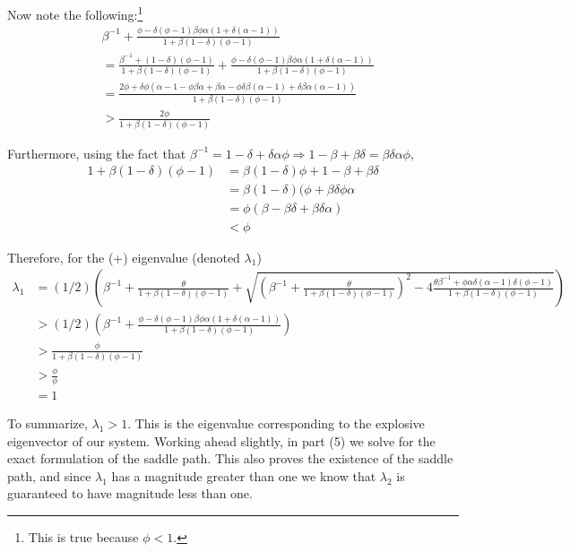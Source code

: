 \documentclass[11pt]{article} %
\begin{document}
Now note the following:\footnote{This is true because $\phi<1.$}
\begin{align*}
&\beta^{-1} +\frac{\phi -  \delta(\phi - 1)\beta \phi \alpha (1 + \delta(\alpha - 1))}{1 + \beta(1-\delta) (\phi - 1)} \\&= \frac{\beta^{-1} + (1-\delta) (\phi - 1)}{1 + \beta(1-\delta) (\phi - 1)}  + \frac{\phi -  \delta(\phi - 1)\beta \phi \alpha (1 + \delta(\alpha - 1))}{1 + \beta(1-\delta) (\phi - 1)} \\
&= \frac{2\phi + \delta \phi (\alpha - 1 - \phi \beta \alpha + \beta \alpha - \phi \delta \beta (\alpha - 1) + \delta\beta\alpha(\alpha - 1))  }{1 + \beta(1-\delta) (\phi - 1)}\\
&> \frac{2\phi }{1 + \beta(1-\delta) (\phi - 1)}
\end{align*}

Furthermore, using the fact that $\beta^{-1} = 1-\delta + \delta\alpha \phi \Rightarrow 1-\beta+\beta\delta = \beta\delta\alpha\phi,$
\begin{align*}
1 + \beta(1-\delta)(\phi - 1) &= \beta(1-\delta)\phi + 1 - \beta + \beta\delta\\
&= \beta(1-\delta)(\phi + \beta\delta\phi\alpha\\
&= \phi(\beta - \beta\delta + \beta\delta\alpha)\\
&<\phi
\end{align*}

Therefore, for the (+) eigenvalue (denoted $\lambda_1$)
\begin{align*}
\lambda_1 &= (1/2)\left( \beta^{-1} +\frac{\theta}{1 + \beta(1-\delta) (\phi - 1)} + \sqrt{\left( \beta^{-1} +\frac{\theta}{1 + \beta(1-\delta) (\phi - 1)}\right)^2 - 4\frac{\theta \beta^{-1} + \phi \alpha \delta (\alpha - 1)\delta(\phi - 1)}{1 + \beta(1-\delta) (\phi - 1)}} \right)\\
&>(1/2)\left(\beta^{-1} + \frac{\phi -  \delta(\phi - 1)\beta \phi \alpha (1 + \delta(\alpha - 1))}{1 + \beta(1-\delta) (\phi - 1)}\right)\\
&> \frac{\phi }{1 + \beta(1-\delta) (\phi - 1)}\\
&> \frac{\phi }{\phi}\\
&= 1
\end{align*}

To summarize, $\lambda_1 > 1.$ This is the eigenvalue corresponding to the explosive eigenvector of our system. Working ahead slightly, in part (5) we solve for the exact formulation of the saddle path. This also proves the existence of the saddle path, and since $\lambda_1$ has a magnitude greater than one we know that $\lambda_2$ is guaranteed to have magnitude less than one.
\end{document}
